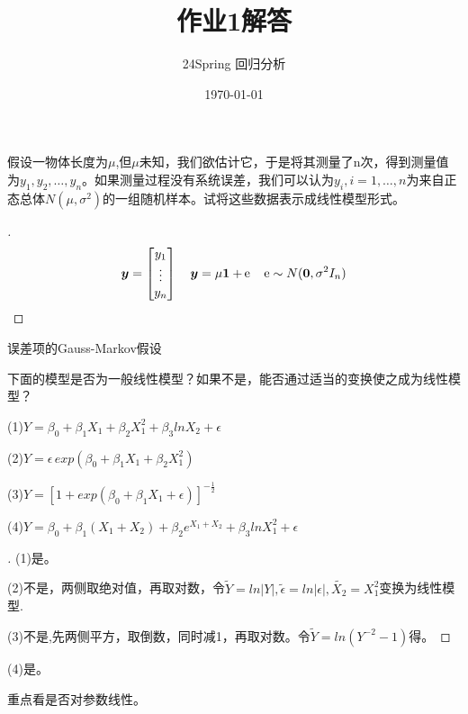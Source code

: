 \documentclass[cn,hazy,green,12pt,normal]{elegantnote}
\title{作业1解答}
\author{24Spring 回归分析}
\date{\today}
\DeclareMathOperator{\e}{\!\!\;\mathrm e}
\numberwithin{equation}{section}
\numberwithin{subsection}{section}
\begin{document}
\maketitle
\begin{homework}
    假设一物体长度为$\mu$,但$\mu$未知，我们欲估计它，于是将其测量了n次，得到测量值为$y_1,y_2,\dots,y_n$。如果测量过程没有系统误差，我们可以认为$y_i,i=1,\dots,n$为来自正态总体$N(\mu,\sigma^2)$的一组随机样本。试将这些数据表示成线性模型形式。
\end{homework}

\begin{proof}[\solutionname]
    \[ 
    \bm y= \begin{bmatrix}
        y_1\\
        \vdots\\
        y_n
    \end{bmatrix}\quad
    \bm y=\mu \bm 1 + \bm \e \quad
    \bm \e \sim N(\bm 0, \sigma^2 I_n)
    \]
\end{proof}

\begin{note}
    误差项的Gauss-Markov假设
\end{note}

\begin{homework}
    下面的模型是否为一般线性模型？如果不是，能否通过适当的变换使之成为线性模型？

    (1)$Y=\beta_0+\beta_1X_1+\beta_2X_1^2+\beta_3lnX_2+\epsilon$

    (2)$Y=\epsilon \,exp(\beta_0+\beta_1X_1+\beta_2X_1^2)$

    (3)$Y=[1+exp(\beta_0+\beta_1X_1+\epsilon)]^{-\frac{1}{2}}$

    (4)$Y=\beta_0+\beta_1(X_1+X_2)+\beta_2e^{X_1+X_2}+\beta_3lnX_1^2+\epsilon$
\end{homework}
\begin{proof}[\solutionname]
    (1)是。

    (2)不是，两侧取绝对值，再取对数，令$\tilde{Y}=ln |Y|,\tilde{\epsilon}=ln|\epsilon|,\tilde{X_2}=X_1^2$变换为线性模型.

    (3)不是,先两侧平方，取倒数，同时减1，再取对数。令$\tilde{Y}=ln(Y^{-2}-1)$得。
\end{proof}

(4)是。

\begin{note}
    重点看是否对参数线性。
\end{note}
\end{document}
